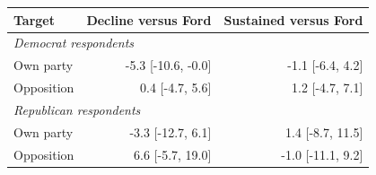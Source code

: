 \begin{tabular}{lrr}
\toprule
Target & Decline versus Ford & Sustained versus Ford \\
\midrule
\multicolumn{3}{l}{\textit{Democrat respondents}} \\
Own party & -5.3 [-10.6, -0.0] & -1.1 [-6.4, 4.2] \\
Opposition & 0.4 [-4.7, 5.6] & 1.2 [-4.7, 7.1] \\
\multicolumn{3}{l}{\textit{Republican respondents}} \\
Own party & -3.3 [-12.7, 6.1] & 1.4 [-8.7, 11.5] \\
Opposition & 6.6 [-5.7, 19.0] & -1.0 [-11.1, 9.2] \\
\bottomrule
\end{tabular}
